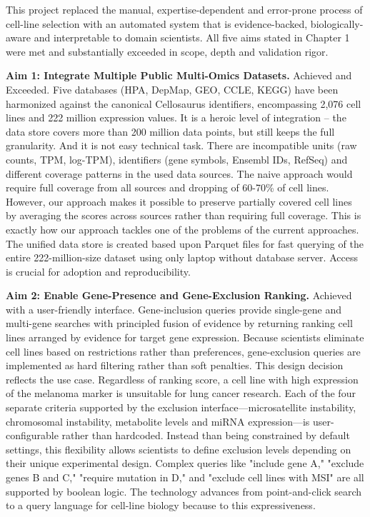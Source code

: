 \documentclass[author={Karen Coutinho, Ishaan Bhalla, Aman Raj, Dixit Kaloorani Malarmannan},
                supervisor={Dr. Daniel D'Andrea},
                degree={MSc},
                title={CellSelector Omics: A Multi-Omics Recommendation System for Cell Line Selection},
                subtitle={},
                type={},
                year={2026}]{dissertation}
\begin{document}
This project replaced the manual, expertise-dependent and error-prone process of cell-line selection with an automated system that is evidence-backed, biologically-aware and interpretable to domain scientists. All five aims stated in Chapter 1 were met and substantially exceeded in scope, depth and validation rigor.

{\bf Aim 1: Integrate Multiple Public Multi-Omics Datasets.} Achieved and Exceeded. Five databases (HPA, DepMap, GEO, CCLE, KEGG) have been harmonized against the canonical Cellosaurus identifiers, encompassing 2,076 cell lines and 222 million expression values. It is a heroic level of integration – the data store covers more than 200 million data points, but still keeps the full granularity. And it is not easy technical task. There are incompatible units (raw counts, TPM, log-TPM), identifiers (gene symbols, Ensembl IDs, RefSeq) and different coverage patterns in the used data sources. The naive approach would require full coverage from all sources and dropping of 60-70\% of cell lines. However, our approach makes it possible to preserve partially covered cell lines by averaging the scores across sources rather than requiring full coverage. This is exactly how our approach tackles one of the problems of the current approaches. The unified data store is created based upon Parquet files for fast querying of the entire 222-million-size dataset using only laptop without database server. Access is crucial for adoption and reproducibility.

{\bf Aim 2: Enable Gene-Presence and Gene-Exclusion Ranking.} Achieved with a user-friendly interface. Gene-inclusion queries provide single-gene and multi-gene searches with principled fusion of evidence by returning ranking cell lines arranged by evidence for target gene expression. Because scientists eliminate cell lines based on restrictions rather than preferences, gene-exclusion queries are implemented as hard filtering rather than soft penalties. This design decision reflects the use case. Regardless of ranking score, a cell line with high expression of the melanoma marker is unsuitable for lung cancer research. Each of the four separate criteria supported by the exclusion interface—microsatellite instability, chromosomal instability, metabolite levels and miRNA expression—is user-configurable rather than hardcoded. Instead than being constrained by default settings, this flexibility allows scientists to define exclusion levels depending on their unique experimental design. Complex queries like "include gene A," "exclude genes B and C," "require mutation in D," and "exclude cell lines with MSI" are all supported by boolean logic. The technology advances from point-and-click search to a query language for cell-line biology because to this expressiveness.
\end{document}
